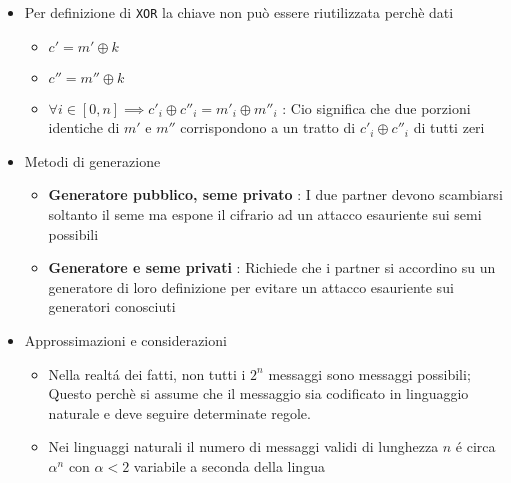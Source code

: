 \begin{itemize}
    \item Per definizione di \texttt{XOR} la chiave non pu\`o essere riutilizzata perch\`e dati
    \begin{itemize}
        \item $c' = m' \oplus k$
        \item $c'' = m'' \oplus k$
        \item $\forall i \in [0, n] \implies c'_i \oplus c''_i = m'_i \oplus m''_i$ : Cio significa che due porzioni identiche di $m'$ e $m''$ corrispondono a un tratto di $c'_i \oplus c''_i$ di tutti zeri
    \end{itemize}
    \item Metodi di generazione
    \begin{itemize}
        \item \textbf{Generatore pubblico, seme privato} : I due partner devono scambiarsi soltanto il seme ma espone il cifrario ad un attacco esauriente sui semi possibili
        \item \textbf{Generatore e seme privati} : Richiede che i partner si accordino su un generatore di loro definizione per evitare un attacco esauriente sui generatori conosciuti
    \end{itemize}
    \newpage
    \item Approssimazioni e considerazioni
    \begin{itemize}
        \item Nella realt\'a dei fatti, non tutti i $2^n$ messaggi sono messaggi possibili; Questo perch\`e si assume che il messaggio sia codificato in linguaggio naturale e deve seguire determinate regole.
        \item Nei linguaggi naturali il numero di messaggi validi di lunghezza $n$ \'e circa $\alpha^n$ con $\alpha < 2$ variabile a seconda della lingua
    \end{itemize}
\end{itemize}